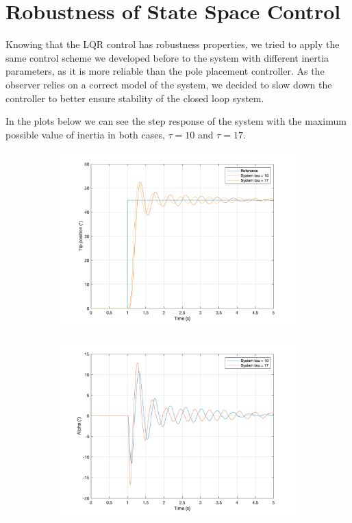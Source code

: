 \section{Robustness of State Space Control}

Knowing that the LQR control has robustness properties, we tried to apply the same control scheme we developed before to the system with different inertia parameters, as it is more reliable than the pole placement controller. 
As the observer relies on a correct model of the system, we decided to slow down the controller to better ensure stability of the closed loop system. 

In the plots below we can see the step response of the system with the maximum possible value of inertia in both cases, $\tau = 10$ and $\tau = 17$.

\begin{figure}[H]
     \centering
     \begin{subfigure}{0.47\textwidth}
         \centering
         \includegraphics[width=\textwidth]{./images/Chapter 5/LQR/Step_unc.png}
     \end{subfigure}
     \hfill
     \begin{subfigure}{0.47\textwidth}
         \centering
         \includegraphics[width=\textwidth]{./images/Chapter 5/LQR/Alpha_unc.png}
     \end{subfigure}
\end{figure}

